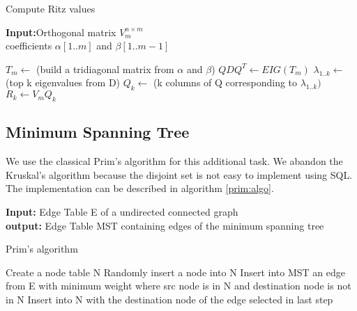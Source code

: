 \begin{algorithm}
\caption{Compute Ritz values}
{\bf Input:}Orthogonal matrix $V^{n\times m}_{m}$\\
coefficients $\alpha[1..m]$ and $\beta[1..m-1]$
\begin{algorithmic}[1]
\STATE $T_{m} \leftarrow$ (build a tridiagonal matrix from $\alpha$ and $\beta$)
\STATE $QDQ^{T} \leftarrow EIG(T_{m})$
\STATE $\lambda_{1..k} \leftarrow$ (top k eigenvalues from D)
\STATE $Q_{k} \leftarrow $ (k columns of Q corresponding to $\lambda_{1..k})$
\STATE $R_{k} \leftarrow V_{m}Q_{k}$
\end{algorithmic}
\label{eigen:algo3}
\end{algorithm}

\subsection{Minimum Spanning Tree}
We use the classical Prim's algorithm for this additional task. We abandon the Kruskal's algorithm because the disjoint set is not easy to implement using SQL. The implementation can be described in algorithm \ref{prim:algo}.

\begin{algorithm}
{\bf Input:} Edge Table E of a undirected connected graph \\
{\bf output:} Edge Table MST containing edges of the minimum spanning tree
\begin{algorithmic}
\caption{Prim's algorithm}
\STATE Create a node table N
\STATE Randomly insert a node into N
	\STATE Insert into MST an edge from E with minimum weight where src node is in N and destination node is not in N
	\STATE Insert into N with the destination node of the edge selected in last step
\ENDFOR
\end{algorithmic}
\label{prim:algo}
\end{algorithm}




